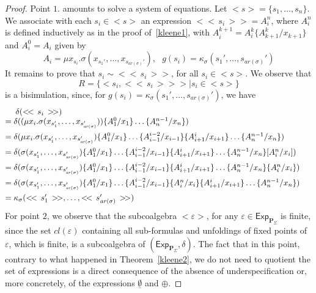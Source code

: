 \documentclass{LMCS}
\newcommand\E\varepsilon
\newcommand\Exp{\mathsf{Exp}}
\newcommand\Pol{\mathbf{P}}
\newcommand\emp{\underline\emptyset}
\def\expr#1{<\!< \, #1 \, >\!>}
\theoremstyle{definition}
\theoremstyle{plain}
\theoremstyle{plain}
\theoremstyle{plain}
\theoremstyle{plain}
\theoremstyle{definition}
\theoremstyle{definition}
\begin{document}
\begin{proof}
Point $1.$ amounts to solve a system of equations. Let $<s> = \{s_1,\ldots, s_n\}$. We associate with each $s_i \in <s>$ an expression $\expr{s_i} = A^n_i$, where $A^n_i$ is defined inductively as in the proof of~\ref{kleene1}, with $A^{k+1}_i = A^k_i\{A^k_{k+1}/x_{k+1}\}$ and $A^0_i = A_i$ given by
\[
A_i = \mu x_{s_i}. \sigma(x_{s_1'}, \ldots, x_{s_{\mathit{ar}(\sigma)}'}), \ \ \ g(s_i) = \kappa_\sigma(s_{1}', \ldots, s_{\mathit{ar}(\sigma)}')
\]
It remains to prove that $s_i \sim \expr{s_i}$, for all $s_i\in <s>$. We observe that
\[
R = \{ <s_i, \expr{s_i}> \mid s_i \in <s> \}
\]
is a bisimulation, since, for $g(s_i) = \kappa_\sigma(s_{1}', \ldots, s_{\mathit{ar}(\sigma)}')$, we have
\[
\begin{array}{@{}ll}
\ \ \ \; \delta(\expr{s_i}) \\
= \delta((\mu x_i.  \sigma(x_{s_1'}, \ldots, x_{s_{\mathit{ar}(\sigma)}'}))  \{A^0_{1}/x_{1}\} \ldots \{A^{n-1}_{n}/x_{n}\}) \\[1.5ex]
=\delta(\mu x_i.  \sigma(x_{s_1'}, \ldots, x_{s_{\mathit{ar}(\sigma)}'})  \{A^0_{1}/x_{1}\} \ldots  \{A^{i-2}_{i-1}/x_{i-1}\}  \{A^i_{i+1}/x_{i+1}\} \ldots\{A^{n-1}_{n}/x_{n}\})\\[1.5ex]
=\delta( \sigma(x_{s_1'}, \ldots, x_{s_{\mathit{ar}(\sigma)}'})  \{A^0_{1}/x_{1}\} \ldots  \{A^{i-2}_{i-1}/x_{i-1}\}  \{A^i_{i+1}/x_{i+1}\} \ldots\{A^{n-1}_{n}/x_{n}\}[A^n_i/x_i])&  \\[1.5ex]
=\delta( \sigma(x_{s_1'}, \ldots, x_{s_{\mathit{ar}(\sigma)}'})  \{A^0_{1}/x_{1}\} \ldots  \{A^{i-2}_{i-1}/x_{i-1}\}  \{A^i_{i+1}/x_{i+1}\} \ldots\{A^{n-1}_{n}/x_{n}\}\{A^n_i/x_i\})&\\[1.5ex]
=\delta( \sigma(x_{s_1'}, \ldots, x_{s_{\mathit{ar}(\sigma)}'})\{A^0_{1}/x_{1}\} \ldots  \{A^{i-2}_{i-1}/x_{i-1}\} \{A^n_i/x_i\} \{A^i_{i+1}/x_{i+1}\} \ldots\{A^{n-1}_{n}/x_{n}\})&\\[1.5ex]
=\kappa_\sigma(\expr{s_1'},\ldots, \expr{s_{\mathit{ar}(\sigma)}'})
\end{array}
\]
For point $2$, we observe that the subcoalgebra $<\E>$, for any $\E\in \Exp_{\Pol_\Sigma}$ is finite, since the set $\mathit{cl}(\E)$ containing all sub-formulas and unfoldings of fixed points of $\E$, which is finite, is a subcoalgebra of  $(\Exp_{\Pol_\Sigma},\delta)$. The fact that in this point, contrary to what happened in Theorem~\ref{kleene2}, we do not need to quotient the set of expressions is a direct consequence of the absence of underspecification or, more concretely, of the expressions $\emp$ and $\oplus$.
\end{proof}
\end{document}
